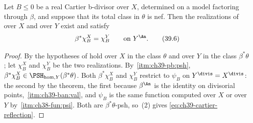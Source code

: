\begin{proposition}
\label{prop:ch39-cartier-reflection}
Let $B\le0$ be a real Cartier b-divisor over $X$, determined on a model
factoring through $\beta$, and suppose that its total class in $\theta$
is nef.  Then the realizations of 
over $X$ and over $Y$ exist and satisfy
\[
 \beta^*\chi^X_B=\chi^Y_B
 \qquad\text{on }Y^{\An}.
\tag{39.6}\label{eq:ch39-cartier-reflection}
\]
\end{proposition}

\begin{proof}
By  the hypotheses of
 hold over $X$ in the class
$\theta$ and over $Y$ in the class $\beta^*\theta$; let $\chi^X_B$
and $\chi^Y_B$ be the two realizations.  By
\,\cref{itm:ch39-pb:psh},
$\beta^*\chi^X_B\in\PSH_{\mathrm{hom},Y}(\beta^*\theta)$.  Both
$\beta^*\chi^X_B$ and $\chi^Y_B$ restrict to $\psi_B$ on
$Y^{\divis}=X^{\divis}$: the second by the theorem, the first because
$\beta^{\An}$ is the identity on divisorial points,
\,\cref{itm:ch39-ban:val}, and
$\psi_B$ is the same function computed over $X$ or over $Y$ by
\,\cref{itm:ch38-fun:psi}.  Both are
$\beta^*\theta$-psh, so
\,(2) gives
\eqref{eq:ch39-cartier-reflection}.
\end{proof}

